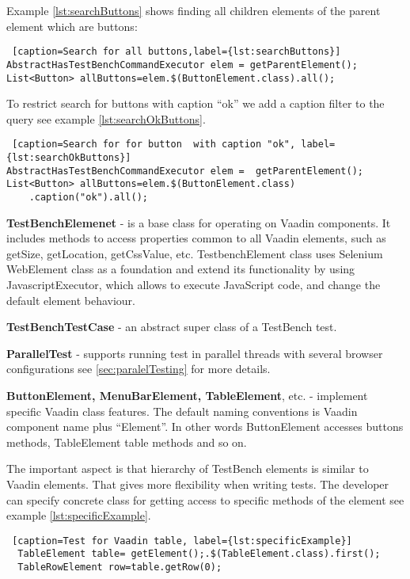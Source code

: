 Example \ref{lst:searchButtons} shows finding all children elements of the
parent element  which are buttons:
  \lstset{style=a1listing}
\begin{lstlisting} [caption=Search for all buttons,label={lst:searchButtons}]
AbstractHasTestBenchCommandExecutor elem = getParentElement();
List<Button> allButtons=elem.$(ButtonElement.class).all();
\end{lstlisting}
  
To restrict search for buttons with caption ``ok'' we add a caption filter to
the query see example \ref{lst:searchOkButtons}.
  \lstset{style=a1listing}
  \begin{lstlisting} [caption=Search for for button  with caption "ok", label={lst:searchOkButtons}]
AbstractHasTestBenchCommandExecutor elem =  getParentElement();
List<Button> allButtons=elem.$(ButtonElement.class)
	.caption("ok").all();
  \end{lstlisting}
  
\textbf{TestBenchElemenet} - is a base class for operating on Vaadin components.
It includes methods to access properties common to all Vaadin elements,
such as getSize, getLocation, getCssValue, etc.
TestbenchElement class uses Selenium WebElement class as a foundation and extend
its functionality by using JavascriptExecutor,
which allows to execute JavaScript code, and change the default element behaviour.

\textbf{TestBenchTestCase} - an abstract super class of a TestBench test.

\textbf{ParallelTest} - supports running test in parallel threads with several
browser configurations see \ref{sec:paralelTesting} for more details.

\textbf{ButtonElement, MenuBarElement, TableElement}, etc. - implement specific
Vaadin class features. The default naming conventions is Vaadin component name
plus ``Element''. In other words ButtonElement accesses buttons methods,
TableElement table methods and so on.

The important aspect is that hierarchy of TestBench elements is similar to
Vaadin elements.
That gives more flexibility when writing tests. The  developer can
specify concrete class for getting access to specific methods of the element see example \ref{lst:specificExample}.
 
\lstset{style=a1listing}
\begin{lstlisting} [caption=Test for Vaadin table, label={lst:specificExample}]
  TableElement table= getElement();.$(TableElement.class).first();
  TableRowElement row=table.getRow(0);
 \end{lstlisting}
 
